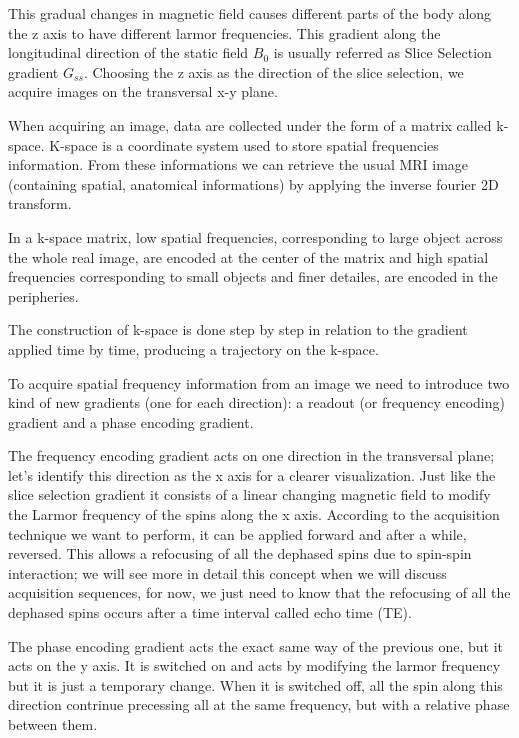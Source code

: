 \documentclass[11pt]{report}
\begin{document}
This gradual changes in magnetic field causes different parts of the body along the z axis to have different larmor frequencies.
This gradient along the longitudinal direction of the static field $B_0$ is usually referred as Slice Selection gradient $G_{ss}$.
Choosing the z axis as the direction of the slice selection, we acquire images on the transversal x-y plane.


When acquiring an image, data are collected under the form of a matrix called k-space.
K-space is a coordinate system used to store spatial frequencies information. From these informations we can retrieve the usual MRI image (containing spatial, anatomical informations) by applying the inverse fourier 2D transform.

In a k-space matrix, low spatial frequencies, corresponding to large object across the whole real image, are encoded at the center of the matrix and high spatial frequencies corresponding to small objects and finer detailes, are encoded in the peripheries.

The construction of k-space is done step by step in relation to the gradient applied time by time, producing a trajectory on the k-space.

To acquire spatial frequency information from an image we need to introduce two kind of new gradients (one for each direction): a readout (or frequency encoding) gradient and a phase encoding gradient.

The frequency encoding gradient acts on one direction in the transversal plane; let's identify this direction as the x axis for a clearer visualization.
Just like the slice selection gradient it consists of a linear changing magnetic field to modify the Larmor frequency of the spins along the x axis. According to the acquisition technique we want to perform, it can be applied forward and after a while, reversed. This allows a refocusing of all the dephased spins due to spin-spin interaction; we will see more in detail this concept when we will discuss acquisition sequences, for now, we just need to know that the refocusing of all the dephased spins occurs after a time interval called echo time (TE).

The phase encoding gradient acts the exact same way of the previous one, but it acts on the y axis. It is switched on and acts by modifying the larmor frequency but it is just a temporary change. When it is switched off, all the spin along this direction contrinue precessing all at the same frequency, but with a relative phase between them.
\end{document}
